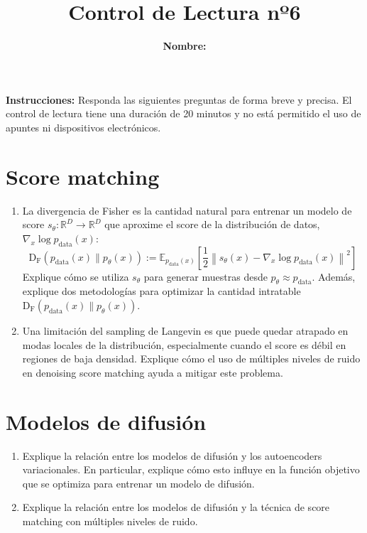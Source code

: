 \documentclass{article}
\title{\bfseries{Control de Lectura nº6}\vspace{0.5cm}}
\author{\textbf{Nombre:} \rule{12cm}{0.4pt}}
\newcommand{\R}{\mathbb{R}}
\begin{document}
\maketitle

\hspace{-0.5cm}\textbf{Instrucciones:} Responda las siguientes preguntas de forma breve y precisa. El control de lectura tiene una duración de 20 minutos y no está permitido el uso de apuntes ni dispositivos electrónicos.

\section*{Score matching}
\begin{enumerate}[{\bf P1.}]
	\item La divergencia de Fisher es la cantidad natural para entrenar un modelo de score $s_\theta:\R^D\to\R^D$ que aproxime el score de la distribución de datos, $\nabla_x\log p_{\text{data}}(x)$:
	\begin{equation*}
		\operatorname{D_F}\left(p_{\text{data}}(x)\|p_\theta(x)\right)
		:= \mathbb{E}_{p_{\text{data}}(x)}\!\left[\frac{1}{2}\left\|s_\theta(x)-\nabla_x\log p_{\text{data}}(x)\right\|^2\right]
	\end{equation*}
	Explique cómo se utiliza $s_\theta$ para generar muestras desde $p_\theta\approx p_{\text{data}}$. Además, explique dos metodologías para optimizar la cantidad intratable $\operatorname{D_F}\left(p_{\text{data}}(x)\|p_\theta(x)\right)$.

	\item Una limitación del sampling de Langevin es que puede quedar atrapado en modas locales de la distribución, especialmente cuando el score es débil en regiones de baja densidad. Explique cómo el uso de múltiples niveles de ruido en denoising score matching ayuda a mitigar este problema.
\end{enumerate}

\section*{Modelos de difusión}
\begin{enumerate}[{\bf P1.}]
	\item Explique la relación entre los modelos de difusión y los autoencoders variacionales. En particular, explique cómo esto influye en la función objetivo que se optimiza para entrenar un modelo de difusión.

	\item Explique la relación entre los modelos de difusión y la técnica de score matching con múltiples niveles de ruido.
\end{enumerate}
\end{document}
